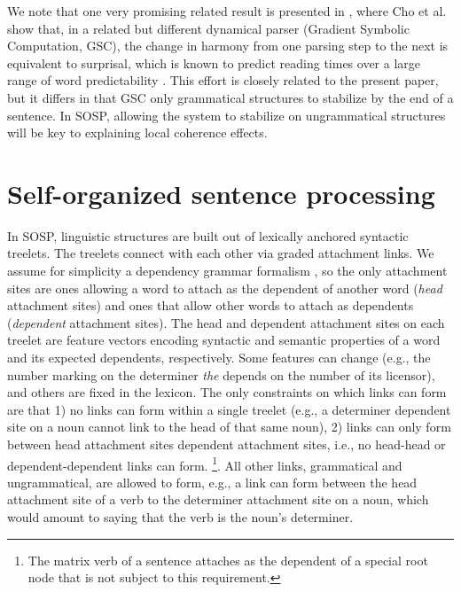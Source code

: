 \documentclass[10pt,letterpaper]{article}
\begin{document}
We note that one very promising related result is presented in , where Cho et al. show that, in a related but different dynamical parser (Gradient Symbolic Computation, GSC), the change in harmony from one parsing step to the next is equivalent to surprisal, which is known to predict reading times over a large range of word predictability \cite{hale2001probabilistic, levy2008expectation, smith2013effect}. This effort is closely related to the present paper, but it differs in that GSC only grammatical structures to stabilize by the end of a sentence. In SOSP, allowing the system to stabilize on ungrammatical structures will be key to explaining local coherence effects.

\section{Self-organized sentence processing}

In SOSP, linguistic structures are built out of lexically anchored syntactic treelets. The treelets connect with each other via graded attachment links. We assume for simplicity a dependency grammar formalism \cite{hudson2007language, mcdonald2013universal}, so the only attachment sites are ones allowing a word to attach as the dependent of another word (\emph{head} attachment sites) and ones that allow other words to attach as dependents (\emph{dependent} attachment sites). The head and dependent attachment sites on each treelet are feature vectors encoding syntactic and semantic properties of a word and its expected dependents, respectively. Some features can change (e.g., the number marking on the determiner \emph{the} depends on the number of its licensor), and others are fixed in the lexicon. The only constraints on which links can form are that 1) no links can form within a single treelet (e.g., a determiner dependent site on a noun cannot link to the head of that same noun), 2) links can only form between head attachment sites dependent attachment sites, i.e., no head-head or dependent-dependent links can form.%
\footnote{The matrix verb of a sentence attaches as the dependent of a special root node that is not subject to this requirement.}. All other links, grammatical and ungrammatical, are allowed to form, e.g., a link can form between the head attachment site of a verb to the determiner attachment site on a noun, which would amount to saying that the verb is the noun's determiner.
\end{document}
